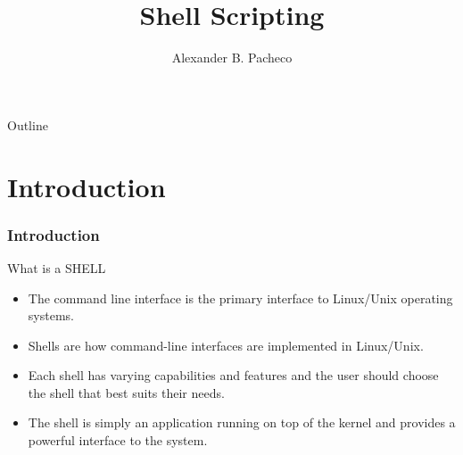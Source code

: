 \documentclass[10pt,t]{beamer}
\title{Shell Scripting}
\author{Alexander B. Pacheco}
\institute{\href{http://researchcomputing.lehigh.edu}{LTS Research Computing}}%
\date{ }
\begin{document}
\begin{frame}
  \titlepage
\end{frame}

\footnotesize
\begin{frame}{Outline}
  \tableofcontents
\end{frame}

\section{Introduction}
\begin{frame}[label=day1]
  \frametitle{Introduction}
  \begin{exampleblock}{What is a SHELL}
    \begin{itemize}
      \item The command line interface is the primary interface to Linux/Unix operating systems.
      \item Shells are how command-line interfaces are implemented in Linux/Unix.
      \item Each shell has varying capabilities and features and the user should choose the shell that best suits their needs.
      \item The shell is simply an application running on top of the kernel and provides a powerful interface to the system.
    \end{itemize}
  \end{exampleblock}
\end{frame}
\end{document}
